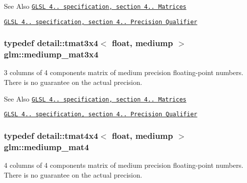\begin{DoxySeeAlso}{See Also}
\href{http://www.opengl.org/registry/doc/GLSLangSpec.4.20.8.pdf}{\tt G\-L\-S\-L 4.. specification, section 4.. Matrices} 

\href{http://www.opengl.org/registry/doc/GLSLangSpec.4.20.8.pdf}{\tt G\-L\-S\-L 4.. specification, section 4.. Precision Qualifier} 
\end{DoxySeeAlso}
\hypertarget{group__core__precision_ga5654236019c6a732844da31534a3cf28}{
\subsubsection[{mediump\-\_\-mat3x4}]{\setlength{\rightskip}{0pt plus 5cm}typedef detail\-::tmat3x4$<$ float, mediump $>$ {\bf glm\-::mediump\-\_\-mat3x4}}}\label{group__core__precision_ga5654236019c6a732844da31534a3cf28}
3 columns of 4 components matrix of medium precision floating-\/point numbers. There is no guarantee on the actual precision.

\begin{DoxySeeAlso}{See Also}
\href{http://www.opengl.org/registry/doc/GLSLangSpec.4.20.8.pdf}{\tt G\-L\-S\-L 4.. specification, section 4.. Matrices} 

\href{http://www.opengl.org/registry/doc/GLSLangSpec.4.20.8.pdf}{\tt G\-L\-S\-L 4.. specification, section 4.. Precision Qualifier} 
\end{DoxySeeAlso}
\hypertarget{group__core__precision_gaf3de9a0400cf707d3c159f32902b92db}{
\subsubsection[{mediump\-\_\-mat4}]{\setlength{\rightskip}{0pt plus 5cm}typedef detail\-::tmat4x4$<$ float, mediump $>$ {\bf glm\-::mediump\-\_\-mat4}}}\label{group__core__precision_gaf3de9a0400cf707d3c159f32902b92db}
4 columns of 4 components matrix of medium precision floating-\/point numbers. There is no guarantee on the actual precision.

